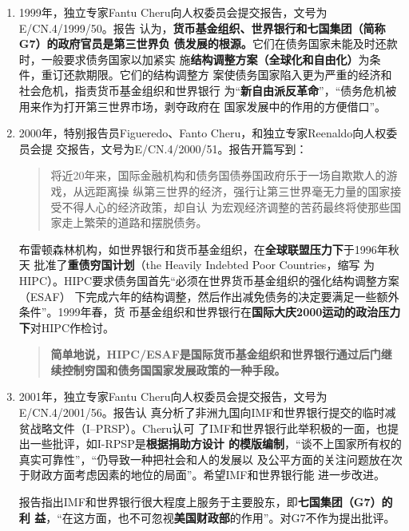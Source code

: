\begin{enumerate}
\item 1999年，独立专家Fantu Cheru向人权委员会提交报告，文号为\\ E/CN.4/1999/50。报告
  认为，\textbf{货币基金组织、世界银行和七国集团（简称G7）的政府官员是第三世界负
    债发展的根源。}它们在债务国家未能及时还款时，一般要求债务国家以加紧实
  施\textbf{结构调整方案（全球化和自由化）}为条件，重订还款期限。它们的结构调整方
  案使债务国家陷入更为严重的经济和社会危机，指责货币基金组织和世界银行
  为“\textbf{新自由派反革命}”，“债务危机被用来作为打开第三世界市场，剥夺政府在
  国家发展中的作用的方便借口”。

\item 2000年，特别报告员Figueredo、Fanto Cheru，和独立专家Reenaldo向人权委员会提
  交报告，文号为E/CN.4/2000/51。报告开篇写到：
  \begin{quotation}
    将近20年来，国际金融机构和债务国债券国政府乐于一场自欺欺人的游戏，从远距离操
    纵第三世界的经济，强行让第三世界毫无力量的国家接受不得人心的经济政策，却自认
    为宏观经济调整的苦药最终将使那些国家走上繁荣的道路和摆脱债务。
  \end{quotation}

  布雷顿森林机构，如世界银行和货币基金组织，在\textbf{全球联盟压力下}于1996年秋天
  批准了\textbf{重债穷国计划}（the Heavily Indebted Poor Countries，缩写
  为HIPC）。HIPC要求债务国首先“必须在世界货币基金组织的强化结构调整方案（ESAF）
  下完成六年的结构调整，然后作出减免债务的决定要满足一些额外条件”。1999年春，货
  币基金组织和世界银行在\textbf{国际大庆2000运动的政治压力下}对HIPC作检讨。
  \begin{quotation} \textbf{简单地说，HIPC/ESAF是国际货币基金组织和世界银行通过后门继续控制穷国和债务国国家发展政策的一种手段。}
  \end{quotation}

\item 2001年，独立专家Fantu Cheru向人权委员会提交报告，文号为\\E/CN.4/2001/56。报告认
  真分析了非洲九国向IMF和世界银行提交的临时减贫战略文件（I--PRSP）。Cheru认可
  了IMF和世界银行此举积极的一面，也提出一些批评，如I-RPSP是\textbf{根据捐助方设计
    的模版编制}，“谈不上国家所有权的真实可靠性”，“仍导致一种把社会和人的发展以
  及公平方面的关注问题放在次于财政方面考虑因素的地位的局面”。希望IMF和世界银行能
  进一步改进。

  报告指出IMF和世界银行很大程度上服务于主要股东，即\textbf{七国集团（G7）的利
    益}，“在这方面，也不可忽视\textbf{美国财政部}的作用”。对G7不作为提出批评。


\end{enumerate}
